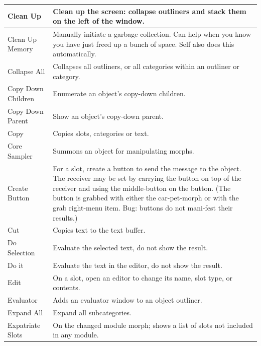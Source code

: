 \documentclass[letterpaper,10pt,english]{sphinxmanual}
\begin{document}
\begin{longtable}{p{5cm} p{10cm}}
Clean Up
 & 
Clean up the screen: collapse outliners and stack them on the left of the window.
\\\hline

Clean Up Memory
 & 
Manually initiate a garbage collection. Can help when you know you have just freed up a bunch of space. Self also does this automatically.
\\\hline

Collapse All
 & 
Collapses all outliners, or all categories within an outliner or category.
\\\hline

Copy Down Children
 & 
Enumerate an object’s copy-down children.
\\\hline

Copy Down Parent
 & 
Show an object’s copy-down parent.
\\\hline

Copy
 & 
Copies slots, categories or text.
\\\hline

Core Sampler
 & 
Summons an object for manipulating morphs.
\\\hline

Create Button
 & 
For a slot, create a button to send the message to the object. The receiver may be set by carrying the button on top of the receiver and using the middle-button on the button. (The button is grabbed with either the car-pet-morph or with the grab right-menu item. Bug: buttons do not mani-fest their results.)
\\\hline

Cut
 & 
Copies text to the text buffer.
\\\hline

Do Selection
 & 
Evaluate the selected text, do not show the result.
\\\hline

Do it
 & 
Evaluate the text in the editor, do not show the result.
\\\hline

Edit
 & 
On a slot, open an editor to change its name, slot type, or contents.
\\\hline

Evaluator
 & 
Adds an evaluator window to an object outliner.
\\\hline

Expand All
 & 
Expand all subcategories.
\\\hline

Expatriate Slots
 & 
On the changed module morph; shows a list of slots not included in any module.
\\\hline


\end{longtable}
\end{document}

